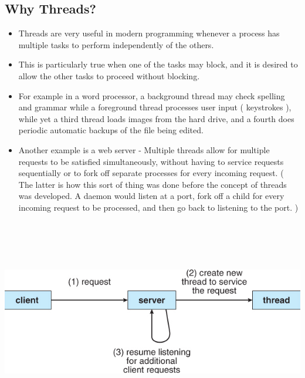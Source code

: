 \documentclass[12pt]{extarticle}
\begin{document}
\newpage

\subsection{Why Threads?}

\begin{itemize}

    \item Threads are very useful in modern programming whenever a process has multiple tasks to perform independently of the others.
    \item This is particularly true when one of the tasks may block, and it is desired to allow the other tasks to proceed without blocking.
    \item For example in a word processor, a background thread may check spelling and grammar while a foreground thread processes user input ( keystrokes ), while yet a third thread loads images from the hard drive, and a fourth does periodic automatic backups of the file being edited.
    \item Another example is a web server - Multiple threads allow for multiple requests to be satisfied simultaneously, without having to service requests sequentially or to fork off separate processes for every incoming request. ( The latter is how this sort of thing was done before the concept of threads was developed. A daemon would listen at a port, fork off a child for every incoming request to be processed, and then go back to listening to the port. )
    
\end{itemize}

\begin{center}

    \includegraphics[width=15cm, height=9cm]{multithreaded}
     
\end{center} 
\end{document}
